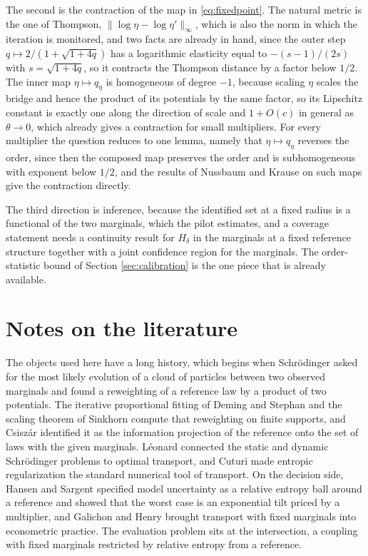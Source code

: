 \documentclass[11pt,a4paper]{article}
\theoremstyle{notesplain}
\theoremstyle{notesupright}
\numberwithin{equation}{section}
\begin{document}
The second is the contraction of the map in \eqref{eq:fixedpoint}. The natural metric is the one of Thompson, $\|\log\eta-\log\eta'\|_\infty$, which is also the norm in which the iteration is monitored, and two facts are already in hand, since the outer step $q\mapsto 2/(1+\sqrt{1+4q})$ has a logarithmic elasticity equal to $-(s-1)/(2s)$ with $s=\sqrt{1+4q}$, so it contracts the Thompson distance by a factor below $1/2$. The inner map $\eta\mapsto q_\eta$ is homogeneous of degree $-1$, because scaling $\eta$ scales the bridge and hence the product of its potentials by the same factor, so its Lipschitz constant is exactly one along the direction of scale and $1+O(c)$ in general as $\theta\to0$, which already gives a contraction for small multipliers. For every multiplier the question reduces to one lemma, namely that $\eta\mapsto q_\eta$ reverses the order, since then the composed map preserves the order and is subhomogeneous with exponent below $1/2$, and the results of Nussbaum \cite{nussbaum} and Krause \cite{krause} on such maps give the contraction directly.

The third direction is inference, because the identified set at a fixed radius is a functional of the two marginals, which the pilot estimates, and a coverage statement needs a continuity result for $H_\delta$ in the marginals at a fixed reference structure together with a joint confidence region for the marginals. The order-statistic bound of Section \ref{sec:calibration} is the one piece that is already available.

\section{Notes on the literature}
\label{sec:literature}
The objects used here have a long history, which begins when Schrödinger \cite{schrodinger} asked for the most likely evolution of a cloud of particles between two observed marginals and found a reweighting of a reference law by a product of two potentials. The iterative proportional fitting of Deming and Stephan \cite{demingstephan} and the scaling theorem of Sinkhorn \cite{sinkhorn} compute that reweighting on finite supports, and Csiszár \cite{csiszar} identified it as the information projection of the reference onto the set of laws with the given marginals. Léonard \cite{leonard} connected the static and dynamic Schrödinger problems to optimal transport, and Cuturi \cite{cuturi} made entropic regularization the standard numerical tool of transport. On the decision side, Hansen and Sargent \cite{hansensargent2001,hansensargent2008} specified model uncertainty as a relative entropy ball around a reference and showed that the worst case is an exponential tilt priced by a multiplier, and Galichon and Henry \cite{galichonhenry} brought transport with fixed marginals into econometric practice. The evaluation problem sits at the intersection, a coupling with fixed marginals restricted by relative entropy from a reference.
\end{document}
